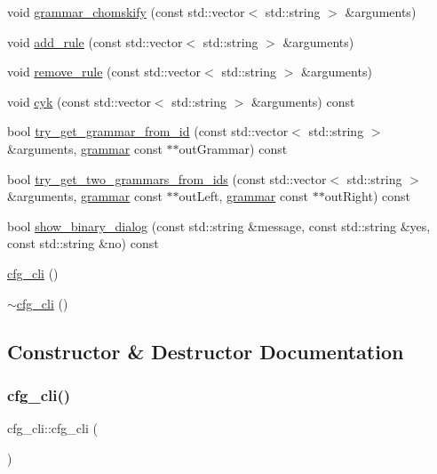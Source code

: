 \begin{DoxyCompactItemize}
\item 
void \mbox{\hyperlink{classcfg__cli_ad4a441afca336701561e489689e60b6a}{grammar\+\_\+chomskify}} (const std\+::vector$<$ std\+::string $>$ \&arguments)
\item 
void \mbox{\hyperlink{classcfg__cli_a9b6c74a0ff4a8d1d8c5b8b7c898da5b8}{add\+\_\+rule}} (const std\+::vector$<$ std\+::string $>$ \&arguments)
\item 
void \mbox{\hyperlink{classcfg__cli_a5daa8ccbc86585416405e7d8ae06de35}{remove\+\_\+rule}} (const std\+::vector$<$ std\+::string $>$ \&arguments)
\item 
void \mbox{\hyperlink{classcfg__cli_a67a7343e67e89eec5851c0b6a3224b36}{cyk}} (const std\+::vector$<$ std\+::string $>$ \&arguments) const
\item 
bool \mbox{\hyperlink{classcfg__cli_ab0f5ffb557534426d320cf66d3d765eb}{try\+\_\+get\+\_\+grammar\+\_\+from\+\_\+id}} (const std\+::vector$<$ std\+::string $>$ \&arguments, \mbox{\hyperlink{classgrammar}{grammar}} const $\ast$$\ast$out\+Grammar) const
\item 
bool \mbox{\hyperlink{classcfg__cli_aba2c11a19403438eb40392cda3a953f2}{try\+\_\+get\+\_\+two\+\_\+grammars\+\_\+from\+\_\+ids}} (const std\+::vector$<$ std\+::string $>$ \&arguments, \mbox{\hyperlink{classgrammar}{grammar}} const $\ast$$\ast$out\+Left, \mbox{\hyperlink{classgrammar}{grammar}} const $\ast$$\ast$out\+Right) const
\item 
bool \mbox{\hyperlink{classcfg__cli_a83a18d4e3a5bfe9ccba1912b2cbbda18}{show\+\_\+binary\+\_\+dialog}} (const std\+::string \&message, const std\+::string \&yes, const std\+::string \&no) const
\item 
\mbox{\hyperlink{classcfg__cli_ad210c1eb0cd98ad0cdd77f163c1ab598}{cfg\+\_\+cli}} ()
\item 
\mbox{\hyperlink{classcfg__cli_ae6d900444e2cb5b820eea4db1a0c3723}{$\sim$cfg\+\_\+cli}} ()
\end{DoxyCompactItemize}


\subsection{Constructor \& Destructor Documentation}
\mbox{\label{classcfg__cli_ad210c1eb0cd98ad0cdd77f163c1ab598}} 
\subsubsection{\texorpdfstring{cfg\_cli()}{cfg\_cli()}}
{\footnotesize\ttfamily cfg\+\_\+cli\+::cfg\+\_\+cli (\begin{DoxyParamCaption}{ }\end{DoxyParamCaption})}

